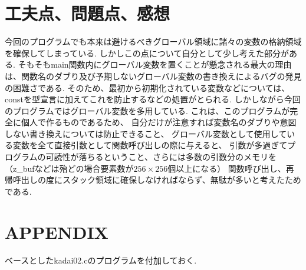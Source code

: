 \documentclass[a4j,dvipdfmx]{jsarticle}
\begin{document}
\section{工夫点、問題点、感想}
今回のプログラムでも本来は避けるべきグローバル領域に諸々の変数の格納領域を確保してしまっている.
しかしこの点について自分として少し考えた部分がある.
そもそもmain関数内にグローバル変数を置くことが懸念される最大の理由は、関数名のダブり及び予期しないグローバル変数の書き換えによるバグの発見の困難さである.
そのため、最初から初期化されている変数などについては、constを型宣言に加えてこれを防止するなどの処置がとられる.
しかしながら今回のプログラムではグローバル変数を多用している.
これは、このプログラムが完全に個人で作るものであるため、
自分だけが注意すれば変数名のダブりや意図しない書き換えについては防止できること、
グローバル変数として使用している変数を全て直接引数として関数呼び出しの際に与えると、
引数が多過ぎてプログラムの可読性が落ちるということ、さらには多数の引数分のメモリを
（z\_bufなどは殆どの場合要素数が$256 \times 256$個以上になる）
関数呼び出し、再帰呼出しの度にスタック領域に確保しなければならず、無駄が多いと考えたためである.
\section{APPENDIX}
ベースとしたkadai02.cのプログラムを付加しておく.

\end{document}
